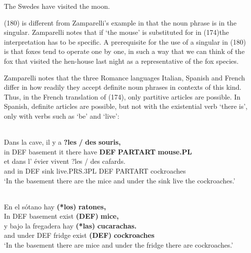 \ea
\gl \label{bkm:Ref94431191}The Swedes have visited the moon.  
 \z

	 (180) is different from Zamparelli’s example in that the noun phrase is in the singular. Zamparelli notes that if  ‘the mouse’ is substituted for in (174)\textstyleLinguisticExample{, }the interpretation has to be specific. A prerequisite for the use of a singular in (180) is that foxes tend to operate one by one, in such a way that we can think of the fox that visited the hen-house last night as a representative of the fox species. 


Zamparelli notes that the three Romance languages Italian, Spanish and French differ in how readily they accept definite noun phrases in contexts of this kind. Thus, in the French translation of (174), only partitive articles are possible. In Spanish, definite articles are possible, but not with the existential verb  ‘there is’, only with verbs such as  ‘be’ and  ‘live’:


\ea \label{} 
\\
\gll Dans  la  cave,  il  y  a  \textbf{?les} \textbf{/} \textbf{des} \textbf{souris,}\\
in  DEF  basement  it  there  have  \textbf{DEF}  \textbf{PARTART} \textbf{mouse.PL}\\
\gll et  dans  l’  évier  vivent  ?les  /  des  cafards.\\
and  in  DEF  sink  live.PRS.3PL  DEF    PARTART  cockroaches\\
\glt ‘In the basement there are the mice and under the sink live the cockroaches.’ 

\z

\ea \label{} 
\\
\gll En  el  sótano  hay  \textbf{(*los)} \textbf{  ratones,}\\
In  DEF  basement  exist  \textbf{(DEF)} \textbf{mice,}\\
\gll y  bajo  la  fregadera  hay  \textbf{(*las)} \textbf{cucarachas.}\\
and  under  DEF  fridge  exist  \textbf{(DEF)} \textbf{cockroaches}\\
\glt ‘In the basement there are mice and under the fridge there are cockroaches.’  

